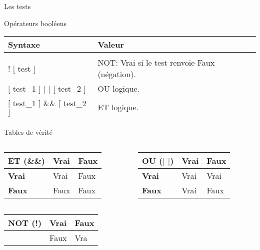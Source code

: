 \begin{frame}{Les tests}
	\begin{block}{Opérateurs booléens}
		\begin{center}
			\begin{tabular}{ll}
				\hline
				Syntaxe&Valeur\\
				\hline\\
				! $[$ test $]$&NOT: Vrai si le test renvoie Faux (négation).\\[2pt]
				$[$ test\_1 $]$ $|$ $|$ $[$ test\_2 $]$&OU logique.\\[2pt]
				$[$ test\_1 $]$ \&\& $[$ test\_2 $]$&ET logique.\\[2pt]
				\hline
			\end{tabular}
		\end{center}
	\end{block}
	\begin{block}{Tables de vérité}
		\begin{columns}
			\begin{column}{5.5cm}
				\begin{center}
					\begin{tabular}{|l|l|l|}
					\hline
					\textbf{ET (\&\&)}&\textbf{Vrai}&\textbf{Faux}\\
					\hline
					\textbf{Vrai}&Vrai&Faux\\
					\hline
					\textbf{Faux}&Faux&Faux\\
					\hline
					\end{tabular}
				\end{center}
			\end{column}
			\begin{column}{5.5cm}
				\begin{center}
					\begin{tabular}{|l|l|l|}
					\hline
					\textbf{OU ($|$ $|$)}&\textbf{Vrai}&\textbf{Faux}\\
					\hline
					\textbf{Vrai}&Vrai&Vrai\\
					\hline
					\textbf{Faux}&Vrai&Faux\\
					\hline
					\end{tabular}
				\end{center}
			\end{column}
		\end{columns}
				\begin{center}
					\begin{tabular}{|l|l|l|}
					\hline
					\textbf{NOT (!)}&\textbf{Vrai}&\textbf{Faux}\\
					\hline
					&Faux&Vra\\
					\hline
					\end{tabular}
				\end{center}
	\end{block}
\end{frame}

